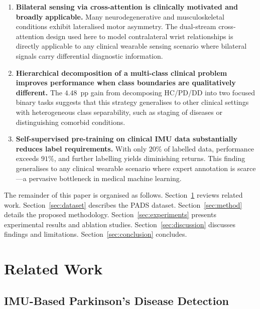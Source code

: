 \documentclass[pmlr]{jmlr}
\begin{document}
\begin{enumerate}
  \item \textbf{Bilateral sensing via cross-attention is clinically
        motivated and broadly applicable.} Many neurodegenerative and
        musculoskeletal conditions exhibit lateralised motor
        asymmetry. The dual-stream cross-attention design used here
        to model contralateral wrist relationships is directly
        applicable to any clinical wearable sensing scenario where
        bilateral signals carry differential diagnostic information.

  \item \textbf{Hierarchical decomposition of a multi-class clinical
        problem improves performance when class boundaries are
        qualitatively different.} The $4.48$~pp gain from
        decomposing HC/PD/DD into two focused binary tasks suggests
        that this strategy generalises to other clinical settings
        with heterogeneous class separability, such as staging of
        diseases or distinguishing comorbid conditions.

  \item \textbf{Self-supervised pre-training on clinical IMU data
        substantially reduces label requirements.} With only $20\%$
        of labelled data, performance exceeds $91\%$, and further
        labelling yields diminishing returns. This finding
        generalises to any clinical wearable scenario where expert
        annotation is scarce---a pervasive bottleneck in medical
        machine learning.
\end{enumerate}

The remainder of this paper is organised as follows.
Section~\ref{sec:related} reviews related work.
Section~\ref{sec:dataset} describes the PADS dataset.
Section~\ref{sec:method} details the proposed methodology.
Section~\ref{sec:experiments} presents experimental results and
ablation studies. Section~\ref{sec:discussion} discusses findings and
limitations. Section~\ref{sec:conclusion} concludes.


\section{Related Work}
\label{sec:related}

\subsection{IMU-Based Parkinson's Disease Detection}
\end{document}
